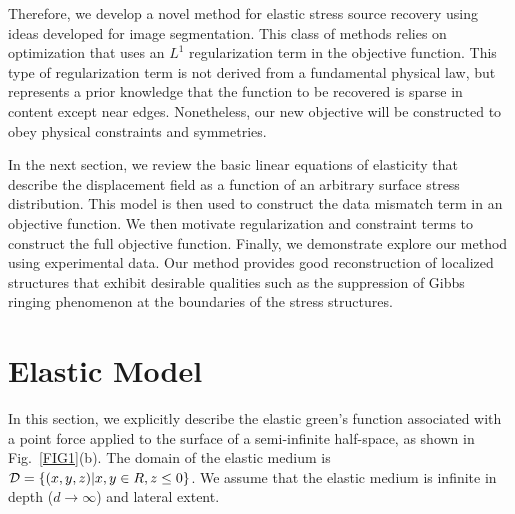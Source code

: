 \documentclass[aps,prl,reprint,twocolumn,groupedaddress,showpacs]{revtex4-1}
\begin{document}
Therefore, we develop a novel method for elastic stress source
recovery using ideas developed for image segmentation.  This class of
methods relies on optimization that uses an $L^{1}$ regularization
term in the objective function.  This type of regularization term is
not derived from a fundamental physical law, but represents a prior
knowledge that the function to be recovered is sparse in content
except near edges.  Nonetheless, our new objective will be constructed
to obey physical constraints and symmetries.

In the next section, we review the basic linear equations of
elasticity that describe the displacement field as a function of an
arbitrary surface stress distribution. This model is then used to
construct the data mismatch term in an objective function. We then
motivate regularization and constraint terms to construct the full
objective function. Finally, we demonstrate explore our method
using experimental data. Our method provides
good reconstruction of localized structures that exhibit desirable
qualities such as the suppression of Gibbs ringing phenomenon at the
boundaries of the stress structures.


\section{Elastic Model}

In this section, we explicitly describe the elastic green's function
associated with a point force applied to the surface of a
semi-infinite half-space, as shown in Fig.~\ref{FIG1}(b). The domain
of the elastic medium is ${\cal D}=\left\{(x,y,z)|x,y\in
R,z\leq0\right\}$. We assume that the elastic medium is infinite
in depth ($d\to \infty$) and lateral extent.
\end{document}
